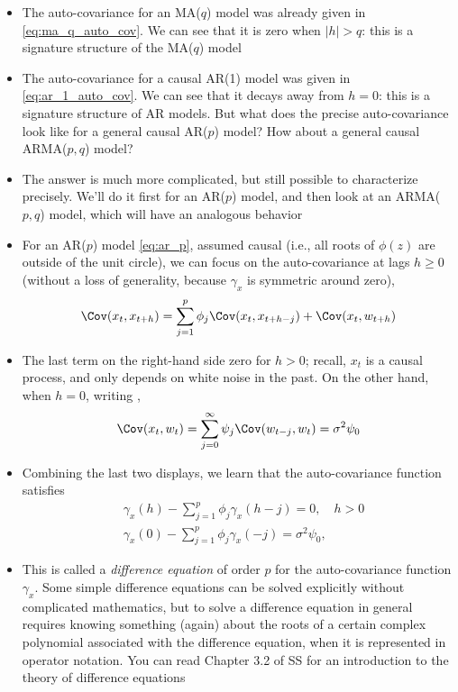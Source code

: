 \documentclass{article}
\begin{document}
\begin{itemize}
\item The auto-covariance for an MA($q$) model was already given in
  \eqref{eq:ma_q_auto_cov}. We can see that it is zero when $|h| > q$: this is a
  signature structure of the MA($q$) model 

\item The auto-covariance for a causal AR(1) model was given in
  \eqref{eq:ar_1_auto_cov}. We can see that it decays away from $h=0$: this is 
  a signature structure of AR models. But what does the precise auto-covariance
  look like for a general causal AR($p$) model? How about a general causal
  ARMA($p,q$) model?  

\item The answer is much more complicated, but still possible to characterize
  precisely. We'll do it first for an AR($p$) model, and then look at an
  ARMA($p,q$) model, which will have an analogous behavior 

\item For an AR($p$) model \eqref{eq:ar_p}, assumed causal (i.e., all roots of
  $\phi(z)$ are outside of the unit circle), we can focus on the auto-covariance  
  at lags $ h \geq 0$ (without a loss of generality, because $\gamma_x$ is
  symmetric around zero), 
  \[
  \Cov(x_t, x_{t+h}) = \sum_{j=1}^p \phi_j \Cov(x_t, x_{t+h-j}) + \Cov(x_t,
  w_{t+h})  
  \]

\item The last term on the right-hand side zero for $h>0$; recall, $x_t$ is a  
  causal process, and only depends on white noise in the past. On the other
  hand, when $h=0$, writing , 
  \[
  \Cov(x_t, w_t) = \sum_{j=0}^\infty \psi_j \Cov(w_{t-j}, w_t) =  \sigma^2
  \psi_0   
  \]

\item Combining the last two displays, we learn that the auto-covariance
  function satisfies 
  \begin{align*}
  &\gamma_x(h) - \sum_{j=1}^p \phi_j \gamma_x(h-j) = 0, \quad h > 0 \\ 
  &\gamma_x(0) - \sum_{j=1}^p \phi_j \gamma_x(-j) = \sigma^2 \psi_0, 
  \end{align*}

\item This is called a \emph{difference equation} of order $p$ for the
  auto-covariance function $\gamma_x$. Some simple difference equations can be
  solved explicitly without complicated mathematics, but to solve a difference  
  equation in general requires knowing something (again) about the roots of a
  certain complex polynomial associated with the difference equation, when it is
  represented in operator notation. You can read Chapter 3.2 of SS for an
  introduction to the theory of difference equations


\end{itemize}
\end{document}
